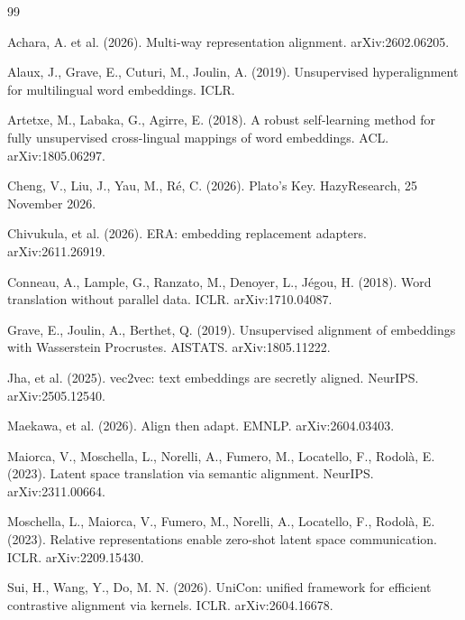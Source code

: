 \documentclass{article}
\begin{document}

\begin{thebibliography}{99}

Achara, A. et al. (2026). Multi-way representation alignment. arXiv:2602.06205.

Alaux, J., Grave, E., Cuturi, M., Joulin, A. (2019). Unsupervised hyperalignment for multilingual word embeddings. ICLR.

Artetxe, M., Labaka, G., Agirre, E. (2018). A robust self-learning method for fully unsupervised cross-lingual mappings of word embeddings. ACL. arXiv:1805.06297.

Cheng, V., Liu, J., Yau, M., R\'e, C. (2026). Plato's Key. HazyResearch, 25 November 2026.

Chivukula, et al. (2026). ERA: embedding replacement adapters. arXiv:2611.26919.

Conneau, A., Lample, G., Ranzato, M., Denoyer, L., J\'egou, H. (2018). Word translation without parallel data. ICLR. arXiv:1710.04087.

Grave, E., Joulin, A., Berthet, Q. (2019). Unsupervised alignment of embeddings with Wasserstein Procrustes. AISTATS. arXiv:1805.11222.

Jha, et al. (2025). vec2vec: text embeddings are secretly aligned. NeurIPS. arXiv:2505.12540.

Maekawa, et al. (2026). Align then adapt. EMNLP. arXiv:2604.03403.

Maiorca, V., Moschella, L., Norelli, A., Fumero, M., Locatello, F., Rodol\`a, E. (2023). Latent space translation via semantic alignment. NeurIPS. arXiv:2311.00664.

Moschella, L., Maiorca, V., Fumero, M., Norelli, A., Locatello, F., Rodol\`a, E. (2023). Relative representations enable zero-shot latent space communication. ICLR. arXiv:2209.15430.

Sui, H., Wang, Y., Do, M. N. (2026). UniCon: unified framework for efficient contrastive alignment via kernels. ICLR. arXiv:2604.16678.


\end{thebibliography}
\end{document}
